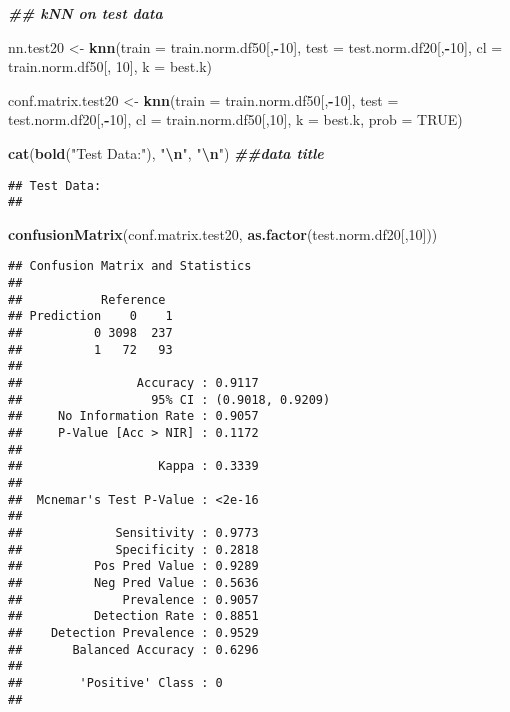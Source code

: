 \documentclass[
]{article}
\newenvironment{Shaded}{\begin{snugshade}}{\end{snugshade}}
\newcommand{\AttributeTok}[1]{\textcolor[rgb]{0.13,0.29,0.53}{#1}}
\newcommand{\ConstantTok}[1]{\textcolor[rgb]{0.56,0.35,0.01}{#1}}
\newcommand{\DecValTok}[1]{\textcolor[rgb]{0.00,0.00,0.81}{#1}}
\newcommand{\DocumentationTok}[1]{\textcolor[rgb]{0.56,0.35,0.01}{\textbf{\textit{#1}}}}
\newcommand{\FunctionTok}[1]{\textcolor[rgb]{0.13,0.29,0.53}{\textbf{#1}}}
\newcommand{\NormalTok}[1]{#1}
\newcommand{\OtherTok}[1]{\textcolor[rgb]{0.56,0.35,0.01}{#1}}
\newcommand{\SpecialCharTok}[1]{\textcolor[rgb]{0.81,0.36,0.00}{\textbf{#1}}}
\newcommand{\StringTok}[1]{\textcolor[rgb]{0.31,0.60,0.02}{#1}}
\begin{document}
\begin{Shaded}
\begin{Highlighting}[]
\DocumentationTok{\#\# kNN on test data}

\NormalTok{nn.test20 }\OtherTok{\textless{}{-}} \FunctionTok{knn}\NormalTok{(}\AttributeTok{train =}\NormalTok{ train.norm.df50[,}\SpecialCharTok{{-}}\DecValTok{10}\NormalTok{], }\AttributeTok{test =}\NormalTok{ test.norm.df20[,}\SpecialCharTok{{-}}\DecValTok{10}\NormalTok{], }\AttributeTok{cl =}\NormalTok{ train.norm.df50[, }\DecValTok{10}\NormalTok{], }\AttributeTok{k =}\NormalTok{ best.k)}


\NormalTok{conf.matrix.test20 }\OtherTok{\textless{}{-}} \FunctionTok{knn}\NormalTok{(}\AttributeTok{train =}\NormalTok{ train.norm.df50[,}\SpecialCharTok{{-}}\DecValTok{10}\NormalTok{], }\AttributeTok{test =}\NormalTok{ test.norm.df20[,}\SpecialCharTok{{-}}\DecValTok{10}\NormalTok{], }\AttributeTok{cl =}\NormalTok{ train.norm.df50[,}\DecValTok{10}\NormalTok{], }\AttributeTok{k =}\NormalTok{ best.k, }\AttributeTok{prob =} \ConstantTok{TRUE}\NormalTok{)}

\FunctionTok{cat}\NormalTok{(}\FunctionTok{bold}\NormalTok{(}\StringTok{"Test Data:"}\NormalTok{), }\StringTok{"}\SpecialCharTok{\textbackslash{}n}\StringTok{"}\NormalTok{, }\StringTok{"}\SpecialCharTok{\textbackslash{}n}\StringTok{"}\NormalTok{) }\DocumentationTok{\#\#data title}
\end{Highlighting}
\end{Shaded}

\begin{verbatim}
## Test Data: 
## 
\end{verbatim}

\begin{Shaded}
\begin{Highlighting}[]
\FunctionTok{confusionMatrix}\NormalTok{(conf.matrix.test20, }\FunctionTok{as.factor}\NormalTok{(test.norm.df20[,}\DecValTok{10}\NormalTok{]))}
\end{Highlighting}
\end{Shaded}

\begin{verbatim}
## Confusion Matrix and Statistics
## 
##           Reference
## Prediction    0    1
##          0 3098  237
##          1   72   93
##                                           
##                Accuracy : 0.9117          
##                  95% CI : (0.9018, 0.9209)
##     No Information Rate : 0.9057          
##     P-Value [Acc > NIR] : 0.1172          
##                                           
##                   Kappa : 0.3339          
##                                           
##  Mcnemar's Test P-Value : <2e-16          
##                                           
##             Sensitivity : 0.9773          
##             Specificity : 0.2818          
##          Pos Pred Value : 0.9289          
##          Neg Pred Value : 0.5636          
##              Prevalence : 0.9057          
##          Detection Rate : 0.8851          
##    Detection Prevalence : 0.9529          
##       Balanced Accuracy : 0.6296          
##                                           
##        'Positive' Class : 0               
## 
\end{verbatim}
\end{document}

